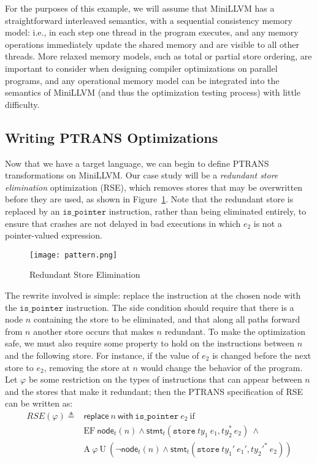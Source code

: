\documentclass{eptcs}
\newcommand{\ptrans}[0]{PTRANS}
\newcommand{\AU}[2]{\textrm{A}\ #1\ \textrm{U}\ #2}
\begin{document}
For the purposes of this example, we will assume that MiniLLVM has a straightforward interleaved semantics, with a sequential consistency memory model: i.e., in each step one thread in the program executes, and any memory operations immediately update the shared memory and are visible to all other threads. More relaxed memory models, such as total or partial store ordering, are important to consider when designing compiler optimizations on parallel programs, and any operational memory model can be integrated into the semantics of MiniLLVM (and thus the optimization testing process) with little difficulty.

\subsection{Writing {\ptrans} Optimizations}
\label{opts}
Now that we have a target language, we can begin to define {\ptrans} transformations on MiniLLVM. Our case study will be a \emph{redundant store elimination} optimization (RSE), which removes stores that may be overwritten before they are used, as shown in Figure~\ref{pattern}. Note that the redundant store is replaced by an $\mathtt{is\_pointer}$ instruction, rather than being eliminated entirely, to ensure that crashes are not delayed in bad executions in which $e_2$ is not a pointer-valued expression.
\begin{figure}[htbp]
\centering
\texttt{[image: pattern.png]}
\caption{Redundant Store Elimination}
\label{pattern}
\end{figure}

The rewrite involved is simple: replace the instruction at the chosen node with the $\mathtt{is\_pointer}$ instruction. The side condition should require that there is a node $n$ containing the store to be eliminated, and that along all paths forward from $n$ another store occurs that makes $n$ redundant. To make the optimization safe, we must also require some property to hold on the instructions between $n$ and the following store. For instance, if the value of $e_2$ is changed before the next store to $e_2$, removing the store at $n$ would change the behavior of the program. Let $\varphi$ be some restriction on the types of instructions that can appear between $n$ and the stores that make it redundant; then the {\ptrans} specification of RSE can be written as:
$$\begin{array}{ll}\mathit{RSE}(\varphi) \triangleq &\mathsf{replace}\ n\ \mathsf{with}\ \mathtt{is\_pointer}\ e_2\ \mathrm{if}\\ &\mathrm{EF}\ \mathsf{node}_t(n) \land \mathsf{stmt}_t(\mathtt{store}\ \mathit{ty}_1\ e_1, \mathit{ty}_2^{*}\ e_2)\ \land \\ &\AU{\varphi}{(\neg\mathsf{node}_t(n) \land \mathsf{stmt}_t(\mathtt{store}\ \mathit{ty}_1'\ e_1', \mathit{ty}_2'^{*}\ e_2))}\end{array}$$
\end{document}
